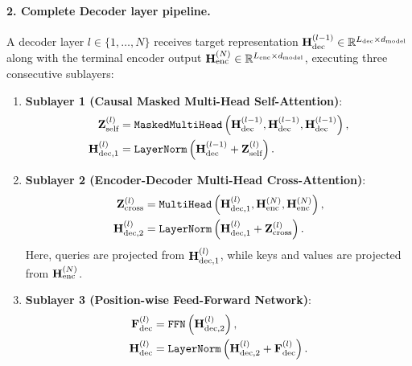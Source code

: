 \documentclass[../../main.tex]{subfiles}
\begin{document}
\paragraph{2. Complete Decoder layer pipeline.}
A decoder layer $l \in \{1, \dots, N\}$ receives target representation $\mathbf{H}_{\text{dec}}^{(l-1)} \in \mathbb{R}^{L_{\text{dec}} \times d_{\text{model}}}$ along with the terminal encoder output $\mathbf{H}_{\text{enc}}^{(N)} \in \mathbb{R}^{L_{\text{enc}} \times d_{\text{model}}}$, executing three consecutive sublayers:
\begin{enumerate}
    \item \textbf{Sublayer 1 (Causal Masked Multi-Head Self-Attention)}:
    \begin{align}
    \label{eq:dec_sublayer1_attn}
    \mathbf{Z}_{\text{self}}^{(l)} &= \text{\texttt{MaskedMultiHead}}\left(\mathbf{H}_{\text{dec}}^{(l-1)}, \mathbf{H}_{\text{dec}}^{(l-1)}, \mathbf{H}_{\text{dec}}^{(l-1)}\right), \\
    \label{eq:dec_sublayer1_norm}
    \mathbf{H}_{\text{dec}, 1}^{(l)} &= \text{\texttt{LayerNorm}}\left(\mathbf{H}_{\text{dec}}^{(l-1)} + \mathbf{Z}_{\text{self}}^{(l)}\right).
    \end{align}
    \item \textbf{Sublayer 2 (Encoder-Decoder Multi-Head Cross-Attention)}:
    \begin{align}
    \label{eq:dec_sublayer2_attn}
    \mathbf{Z}_{\text{cross}}^{(l)} &= \text{\texttt{MultiHead}}\left(\mathbf{H}_{\text{dec}, 1}^{(l)}, \mathbf{H}_{\text{enc}}^{(N)}, \mathbf{H}_{\text{enc}}^{(N)}\right), \\
    \label{eq:dec_sublayer2_norm}
    \mathbf{H}_{\text{dec}, 2}^{(l)} &= \text{\texttt{LayerNorm}}\left(\mathbf{H}_{\text{dec}, 1}^{(l)} + \mathbf{Z}_{\text{cross}}^{(l)}\right).
    \end{align}
    Here, queries are projected from $\mathbf{H}_{\text{dec}, 1}^{(l)}$, while keys and values are projected from $\mathbf{H}_{\text{enc}}^{(N)}$.
    \item \textbf{Sublayer 3 (Position-wise Feed-Forward Network)}:
    \begin{align}
    \label{eq:dec_sublayer3_ffn}
    \mathbf{F}_{\text{dec}}^{(l)} &= \text{\texttt{FFN}}\left(\mathbf{H}_{\text{dec}, 2}^{(l)}\right), \\
    \label{eq:dec_sublayer3_norm}
    \mathbf{H}_{\text{dec}}^{(l)} &= \text{\texttt{LayerNorm}}\left(\mathbf{H}_{\text{dec}, 2}^{(l)} + \mathbf{F}_{\text{dec}}^{(l)}\right).
    \end{align}
\end{enumerate}
\end{document}
